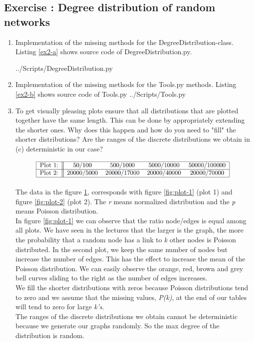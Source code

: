 \documentclass[10pt,a4paper]{article}
\newcommand{\exercise}[1]
{
  \stepcounter{subsection}
  \subsection*{Exercise \thesubsection: #1}

}
\begin{document}
\exercise{Degree distribution of random networks }
\begin{enumerate}
	\item Implementation of the missing methods for the DegreeDistribution-class. Listing \ref{ex2-a} shows source code of DegreeDistribution.py. 
	
	 {../Scripts/DegreeDistribution.py}
	
	\item Implementation of the missing methods for the Tools.py methods. Listing \ref{ex2-b} shows source code of Tools.py
	 {../Scripts/Tools.py}
	
	\newpage
	
	\item To get visually pleasing plots ensure that all distributions that are plotted together have the same length. This can be done by appropriately extending the shorter ones. Why does 	this happen and how do you need to "fill" the shorter distributions? Are the ranges of the discrete distributions we obtain in (c) deterministic in our case?
	

\begin{figure}[H]
	\centering
	\includegraphics[width=0.7\linewidth]{tabledata}
	\caption{}
	\label{fig:tabledata}
\end{figure}

	The data in the figure \ref{fig:tabledata}, corresponds with figure \ref{fig:plot-1} (plot 1) and figure \ref{fig:plot-2} (plot 2). The \textit{r} means normalized distribution and the \textit{p} means Poisson distribution. \\
	
	In figure \ref{fig:plot-1} we can observe that the ratio node/edges is equal among all plots. We have seen in the lectures that the larger is the graph, the more the probability that a random node has a link to \textit{k} other nodes is Poisson distributed. In the second plot, we keep the same number of nodes but increase the number of edges. This has the effect to increase the mean of the Poisson distribution. We can easily observe the orange, red, brown and grey bell curves sliding to the right as the number of edges increases. \\
	
	
	We fill the shorter distributions with zeros because Poisson distributions tend to zero and we assume that the missing values, \textit{P(k)}, at the end of our tables will tend to zero for large \textit{k's}. \\
	
	
	The ranges of the discrete distributions we obtain cannot be deterministic because we generate our graphs randomly. So the max degree of the distribution is random. 
	 


\end{enumerate}
	
\end{document}
